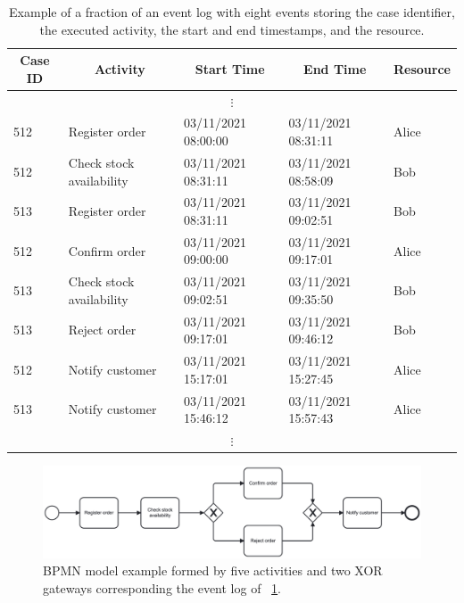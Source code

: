 \documentclass[12pt]{article}
\begin{document}
\begin{table}[t]
    \centering
    \footnotesize
    \begin{tabular}{l l l l l}
    \hline
         \multicolumn{1}{c}{\textbf{Case ID}}  &  \multicolumn{1}{c}{\textbf{Activity}}   &  \multicolumn{1}{c}{\textbf{Start Time}}    &  \multicolumn{1}{c}{\textbf{End Time}}     &  \multicolumn{1}{c}{\textbf{Resource}}   \\ \hline \hline
        
        \multicolumn{5}{c}{$\vdots$}                                                          \\
        512   & Register order    &  03/11/2021 08:00:00  & 03/11/2021 08:31:11  & Alice   \\
        512   & Check stock availability        &  03/11/2021 08:31:11  & 03/11/2021 08:58:09  & Bob    \\
        513   & Register order    &  03/11/2021 08:31:11  & 03/11/2021 09:02:51  & Bob   \\
        512   & Confirm order   &  03/11/2021 09:00:00  & 03/11/2021 09:17:01  & Alice  \\
        513   & Check stock availability        &  03/11/2021 09:02:51  & 03/11/2021 09:35:50  & Bob    \\
        513   & Reject order   &  03/11/2021 09:17:01  & 03/11/2021 09:46:12  & Bob  \\
        512   & Notify customer         &  03/11/2021 15:17:01  & 03/11/2021 15:27:45  & Alice   \\
        513   & Notify customer         &  03/11/2021 15:46:12  & 03/11/2021 15:57:43  & Alice   \\
        \multicolumn{5}{c}{$\vdots$}                                                          \\ \hline
    \end{tabular}
    \caption{Example of a fraction of an event log with eight events storing the case identifier, the executed activity, the start and end timestamps, and the resource.}
    \label{tab:activity-instance-log-example}    
\end{table}

\begin{figure}[t]
    \centering
    \includegraphics[width=\textwidth]{figures/ThesisModel.png}
    \caption{BPMN model example formed by five activities and two XOR gateways corresponding the event log of \tablename~\ref{tab:activity-instance-log-example}.}
    \label{fig:bpmn-model-example}
\end{figure}
\end{document}

